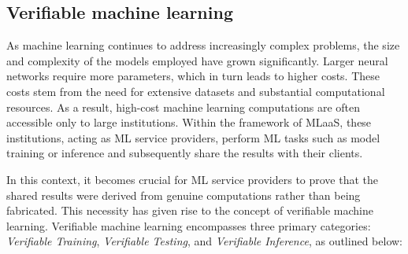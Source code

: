 \documentclass[journal]{IEEEtran}
\begin{document}
\subsection{Verifiable machine learning}\label{ss:2c}
As machine learning continues to address increasingly complex problems, the size and complexity of the models employed have grown significantly. Larger neural networks require more parameters, which in turn leads to higher costs. These costs stem from the need for extensive datasets and substantial computational resources. As a result, high-cost machine learning computations are often accessible only to large institutions. Within the framework of MLaaS, these institutions, acting as ML service providers, perform ML tasks such as model training or inference and subsequently share the results with their clients. 

In this context, it becomes crucial for ML service providers to prove that the shared results were derived from genuine computations rather than being fabricated. This necessity has given rise to the concept of verifiable machine learning. Verifiable machine learning encompasses three primary categories:  \emph{Verifiable Training}, \emph{Verifiable Testing}, and \emph{Verifiable Inference}, as outlined below:
\end{document}
